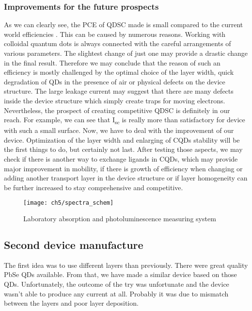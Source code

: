 \subsubsection{Improvements for the future prospects}

As we can clearly see, the PCE of QDSC made is small compared to the
current world efficiencies \cite{Kamat2018}. This can be caused by numerous reasons. Working with colloidal quantum dots is always connected with the careful arrangements of various parameters. The slightest change of just one may provide a drastic change in the final result. Therefore we may conclude that the reason of such an efficiency is mostly challenged by the optimal choice of the layer width, quick degradation of QDs in the presence of air or physical defects on the device structure. The large leakage current may suggest that there are many defects inside the device structure which simply create traps for moving electrons. Nevertheless, the prospect of creating competitive QDSC is definitely in our reach. For example, we can see that I\textsubscript{sc} is really more than satisfactory for device with such a small surface. Now, we have to deal with the improvement of our device. Optimization of the layer width and enlarging of CQDs stability will be the first things to do, but certainly not last. After testing those aspects, we may check if there is another way to exchange ligands in CQDs, which may provide major improvement in mobility, if there is growth of efficiency when changing or adding another transport layer in the device structure or if layer homogeneity can be further increased to stay comprehensive and competitive.

\begin{figure}
\centering
\texttt{[image: ch5/spectra\_schem]}
\caption{Laboratory absorption and photoluminescence measuring system }
\label{fig:pomiary}
\end{figure}
\newpage

\subsection{Second device manufacture}

The first idea was to use different layers than previously. There were great quality PbSe QDs available. From that, we have made a similar device based on those QDs. Unfortunately, the outcome of the try was unfortunate and the device wasn't able to produce any current at all. Probably it was due to mismatch between the layers and poor layer deposition. 

